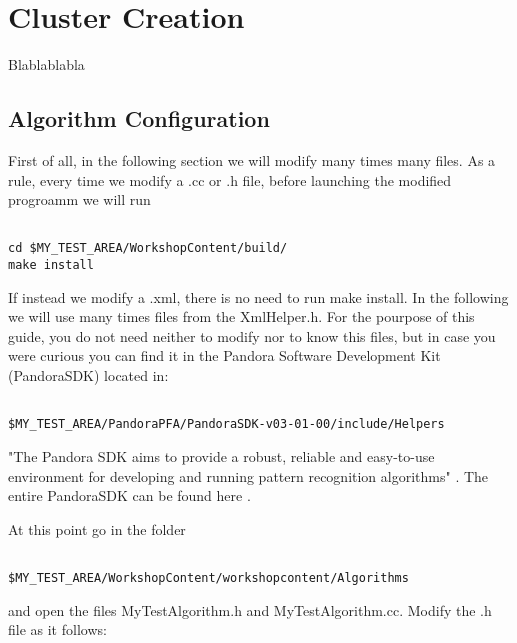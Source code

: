 \chapter{Cluster Creation}

Blablablabla

\section{Algorithm Configuration} \label{sssec:algo_config}

First of all, in the following section we will modify many times many files. As a rule, every time we modify a .cc or .h file, before launching the modified progroamm we will run



\begin{lstlisting}[caption=Build, label=build]

cd $MY_TEST_AREA/WorkshopContent/build/
make install

\end{lstlisting}


If instead we modify a .xml, there is no need to run make install. In the following we will use many times files from the XmlHelper.h. For the pourpose of this guide, you do not need neither to modify nor to know this files, but in case you were curious you can find it in the Pandora Software Development Kit (PandoraSDK) located in:

\begin{verbatim}

$MY_TEST_AREA/PandoraPFA/PandoraSDK-v03-01-00/include/Helpers

\end{verbatim}

"The Pandora SDK aims to provide a robust, reliable and easy-to-use environment for developing and running pattern recognition algorithms" \cite{pandorasdk_paper}. The entire PandoraSDK can be found here \cite{pandora_doc}. 

At this point go in the folder

\begin{verbatim}

$MY_TEST_AREA/WorkshopContent/workshopcontent/Algorithms

\end{verbatim}

and open the files MyTestAlgorithm.h and MyTestAlgorithm.cc. Modify the .h file as it follows:

